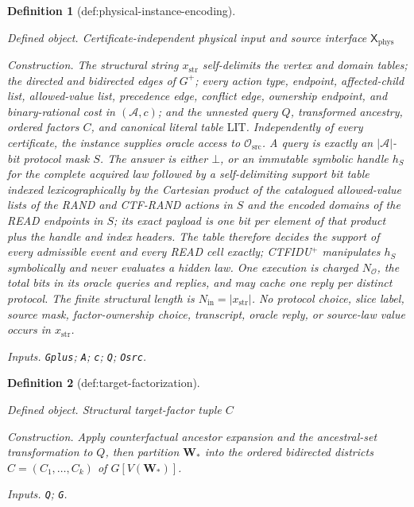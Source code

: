 \documentclass{article}
\newtheorem{definition}{Definition}
\begin{document}
\begin{definition}[def:physical-instance-encoding]\label{def:physical-instance-encoding}
\par\smallskip\noindent\emph{Defined object.} Certificate-independent physical input and source interface \(\mathsf X_{\mathrm{phys}}\)
\par\smallskip\noindent\emph{Construction.} The structural string \(x_{\mathrm{str}}\) self-delimits the vertex and domain tables; the directed and bidirected edges of \(G^{+}\); every action type, endpoint, affected-child list, allowed-value list, precedence edge, conflict edge, ownership endpoint, and binary-rational cost in \((\mathcal A,c)\); and the unnested query \(Q\), transformed ancestry, ordered factors \(C\), and canonical literal table \(\mathrm{LIT}\). Independently of every certificate, the instance supplies oracle access to \(\mathcal O_{\mathrm{src}}\). A query is exactly an \(|\mathcal A|\)-bit protocol mask \(S\). The answer is either \(\bot\), or an immutable symbolic handle \(h_S\) for the complete acquired law followed by a self-delimiting support bit table indexed lexicographically by the Cartesian product of the catalogued allowed-value lists of the RAND and CTF-RAND actions in \(S\) and the encoded domains of the READ endpoints in \(S\); its exact payload is one bit per element of that product plus the handle and index headers. The table therefore decides the support of every admissible event and every READ cell exactly; CTFIDU\({}^{+}\) manipulates \(h_S\) symbolically and never evaluates a hidden law. One execution is charged \(N_{\mathcal O}\), the total bits in its oracle queries and replies, and may cache one reply per distinct protocol. The finite structural length is \(N_{\mathrm{in}}=|x_{\mathrm{str}}|\). No protocol choice, slice label, source mask, factor-ownership choice, transcript, oracle reply, or source-law value occurs in \(x_{\mathrm{str}}\).
\par\smallskip\noindent\emph{Inputs.} \texttt{Gplus}; \texttt{A}; \texttt{c}; \texttt{Q}; \texttt{Osrc}.
\end{definition}

\begin{definition}[def:target-factorization]\label{def:target-factorization}
\par\smallskip\noindent\emph{Defined object.} Structural target-factor tuple \(C\)
\par\smallskip\noindent\emph{Construction.} Apply counterfactual ancestor expansion and the ancestral-set transformation to \(Q\), then partition \(\mathbf W_{\ast}\) into the ordered bidirected districts \(C=(C_1,\ldots,C_k)\) of \(G[V(\mathbf W_{\ast})]\).
\par\smallskip\noindent\emph{Inputs.} \texttt{Q}; \texttt{G}.
\end{definition}
\end{document}
